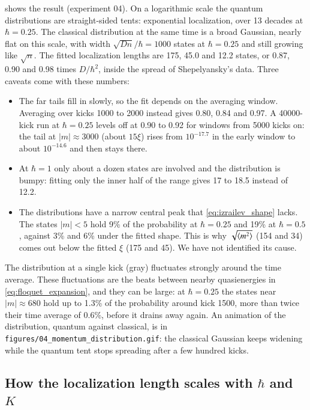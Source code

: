  shows the result (experiment 04). On a logarithmic scale the quantum distributions
are straight-sided tents: exponential localization, over 13 decades at $\hbar = 0.25$. The classical
distribution at the same time is a broad Gaussian, nearly flat on this scale, with width
$\sqrt{Dn}/\hbar = 1000$ states at $\hbar = 0.25$ and still growing like $\sqrt n$. The fitted localization
lengths are 175, 45.0 and 12.2 states, or 0.87, 0.90 and 0.98 times $D/\hbar^2$, inside the spread of
Shepelyansky's data. Three caveats come with these numbers:
\begin{itemize}
  \item The far tails fill in slowly, so the fit depends on the averaging window. Averaging over kicks 1000 to
  2000 instead gives 0.80, 0.84 and 0.97. A 40000-kick run at $\hbar = 0.25$ levels off at 0.90 to 0.92 for
  windows from 5000 kicks on: the tail at $|m| \approx 3000$ (about $15\xi$) rises from $10^{-17.7}$ in the
  early window to about $10^{-14.6}$ and then stays there.
  \item At $\hbar = 1$ only about a dozen states are involved and the distribution is bumpy: fitting only the
  inner half of the range gives 17 to 18.5 instead of 12.2.
  \item The distributions have a narrow central peak that \cref{eq:izrailev_shape} lacks. The states
  $|m| < 5$ hold 9\% of the probability at $\hbar = 0.25$ and 19\% at $\hbar = 0.5$, against 3\% and 6\% under
  the fitted shape. This is why $\sqrt{\langle m^2 \rangle}$ (154 and 34) comes out below the fitted $\xi$ (175 and 45).
  We have not identified its cause.
\end{itemize}
The distribution at a single kick (gray) fluctuates strongly around the time average. These fluctuations are
the beats between nearby quasienergies in \cref{eq:floquet_expansion}, and they can be large: at
$\hbar = 0.25$ the states near $|m| \approx 680$ hold up to 1.3\% of the probability around kick 1500, more
than twice their time average of 0.6\%, before it drains away again. An animation of the distribution, quantum against classical, is in
\texttt{figures/04\_momentum\_distribution.gif}: the classical Gaussian keeps widening while the quantum
tent stops spreading after a few hundred kicks.

\subsection{How the localization length scales with \texorpdfstring{$\hbar$}{hbar} and \texorpdfstring{$K$}{K}}
\label{sec:scaling}

